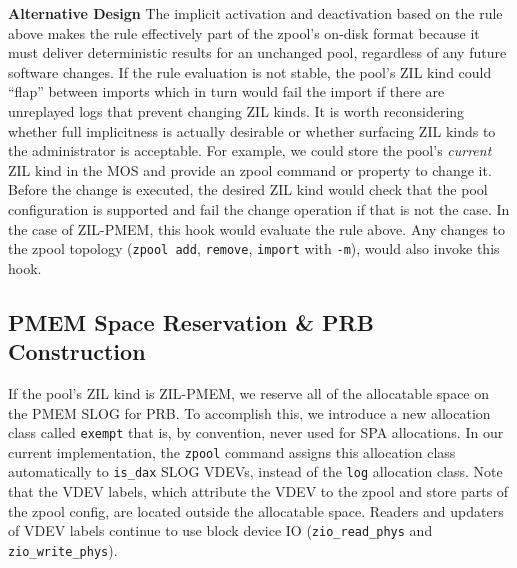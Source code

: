 \documentclass[12pt,a4paper,twoside]{book}
\begin{document}
\textbf{Alternative Design}
The implicit activation and deactivation based on the rule above makes the rule effectively part of the zpool's on-disk format because it must deliver deterministic results for an unchanged pool, regardless of any future software changes.
If the rule evaluation is not stable, the pool's ZIL kind could ``flap'' between imports which in turn would fail the import if there are unreplayed logs that prevent changing ZIL kinds.
It is worth reconsidering whether full implicitness is actually desirable or whether surfacing ZIL kinds to the administrator is acceptable.
For example, we could store the pool's \textit{current} ZIL kind in the MOS and provide an zpool command or property to change it.
Before the change is executed, the desired ZIL kind would check that the pool configuration is supported and fail the change operation if that is not the case.
In the case of ZIL-PMEM, this hook would evaluate the rule above.
Any changes to the zpool topology (\lstinline{zpool add}, \lstinline{remove}, \lstinline{import} with \lstinline{-m}), would also invoke this hook.

\subsection{PMEM Space Reservation \& PRB Construction}\label{sec:zilpmemzilkind:spacereservation}

If the pool's ZIL kind is ZIL-PMEM, we reserve all of the allocatable space on the PMEM SLOG for PRB.
To accomplish this, we introduce a new allocation class called \lstinline{exempt} that is, by convention, never used for SPA allocations.
In our current implementation, the \lstinline{zpool} command assigns this allocation class automatically to \lstinline{is_dax} SLOG VDEVs, instead of the \lstinline{log} allocation class.
Note that the VDEV labels, which attribute the VDEV to the zpool and store parts of the zpool config, are located outside the allocatable space.
Readers and updaters of VDEV labels continue to use block device IO (\lstinline{zio_read_phys} and \lstinline{zio_write_phys}).
\end{document}
